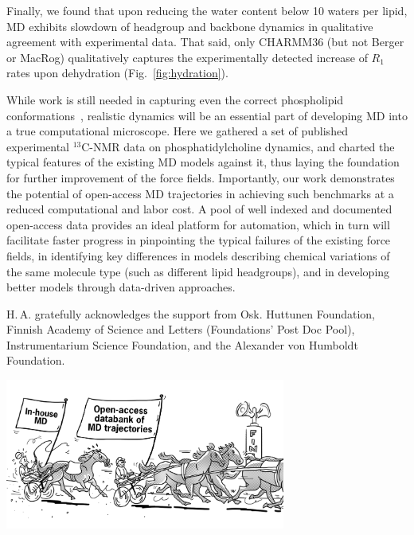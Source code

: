 \documentclass[journal=jcisd8,manuscript=article,layout=twocolumn]{achemso}
\begin{document}
Finally, we found that
upon reducing the water content below 10 waters per lipid, MD exhibits slowdown of headgroup and backbone dynamics  in qualitative agreement with experimental data. That said, only CHARMM36
(but not Berger or MacRog)
qualitatively captures the experimentally detected increase of $R_1$ rates upon dehydration (Fig.~\ref{fig:hydration}).

While work is still needed in capturing even the correct phospholipid conformations~\cite{botan15}, realistic dynamics will be an essential part of developing MD into a true computational microscope.
Here we gathered a set of published experimental $^{13}$C-NMR data on phosphatidylcholine dynamics, and charted the typical features of the existing MD models against it, thus laying the foundation for further improvement of the force fields. 
%
Importantly, our work demonstrates the potential of open-access MD trajectories in achieving such benchmarks at a reduced computational and labor cost. A pool of well indexed and documented open-access data provides an ideal platform for automation, which in turn will facilitate faster progress
in pinpointing the typical failures of the existing force fields,
in identifying key differences in models describing chemical variations of the same molecule type (such as different lipid headgroups), and
in developing better models through data-driven approaches.


\acknowledgement
H.\,A. gratefully acknowledges the support from Osk. Huttunen Foundation, Finnish Academy of Science and Letters (Foundations’ Post Doc Pool), Instrumentarium Science Foundation, and the Alexander von Humboldt Foundation.



\begin{tocentry}
  \vspace{-10mm}
  \hspace{-2mm}
  \includegraphics[width=92mm]{../Figs/Markus_TOC_975x525px_1120_v1.png}
\end{tocentry}
\end{document}
